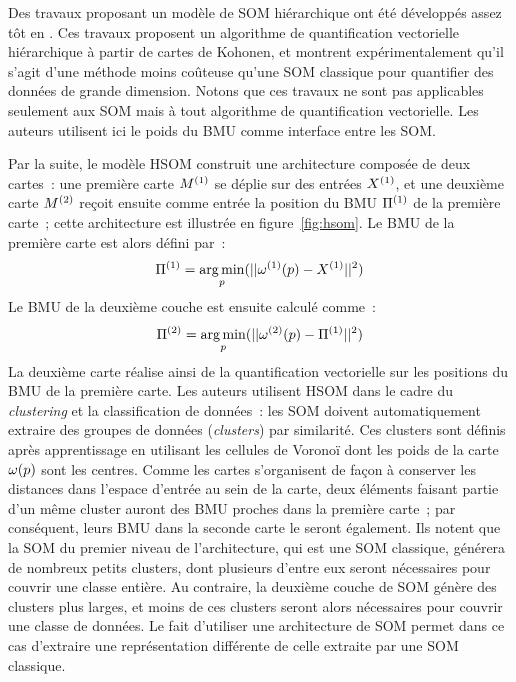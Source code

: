 \documentclass[../main]{subfiles}
\begin{document}
Des travaux proposant un modèle de SOM hiérarchique ont été développés assez tôt en \cite{luttrell_hierarchical_1989}. 
Ces travaux proposent un algorithme de quantification vectorielle hiérarchique à partir de cartes de Kohonen, et montrent expérimentalement qu'il s'agit d'une méthode moins coûteuse qu'une SOM classique pour quantifier des données de grande dimension. Notons que ces travaux ne sont pas applicables seulement aux SOM mais à tout algorithme de quantification vectorielle. Les auteurs utilisent ici le poids du BMU comme interface entre les SOM.

Par la suite, le modèle HSOM \parencite{lampinen_clustering_1992} construit une architecture composée de deux cartes~: une première carte $M^{({1})}$ se déplie sur des entrées $X^{({1})}$, et une deuxième carte $M^{({2})}$ reçoit ensuite comme entrée la position du BMU $\Pi^{({1})}$ de la première carte~; cette architecture est illustrée en figure~\ref{fig:hsom}.
Le BMU de la première carte est alors défini par~:
$$ \Pi^{({1})} = \operatorname*{arg\,min}\limits_p(||\omega^{({1})}(p) - X^{({1})} || ^2)$$
Le BMU de la deuxième couche est ensuite calculé comme~:
$$ \Pi^{({2})}= \operatorname*{arg\,min}\limits_p(||\omega^{({2})}(p) - \Pi^{({1})} || ^2)$$
La deuxième carte réalise ainsi de la quantification vectorielle sur les positions du BMU de la première carte. Les auteurs utilisent HSOM dans le cadre du \emph{clustering} et la classification de données~: les SOM doivent automatiquement extraire des groupes de données (\emph{clusters}) par similarité. Ces clusters sont définis après apprentissage en utilisant les cellules de Voronoï dont les poids de la carte $\omega(p)$ sont les centres.
Comme les cartes s'organisent de façon à conserver les distances dans l'espace d'entrée au sein de la carte, deux éléments faisant partie d'un même cluster auront des BMU proches dans la première carte~; par conséquent, leurs BMU dans la seconde carte le seront également. 
Ils notent que la SOM du premier niveau de l'architecture, qui est une SOM classique, générera de nombreux petits clusters, dont plusieurs d'entre eux seront nécessaires pour couvrir une classe entière. Au contraire, la deuxième couche de SOM génère des clusters plus larges, et moins de ces clusters seront alors nécessaires pour couvrir une classe de données.
Le fait d'utiliser une architecture de SOM permet dans ce cas d'extraire une représentation différente de celle extraite par une SOM classique.
\end{document}
